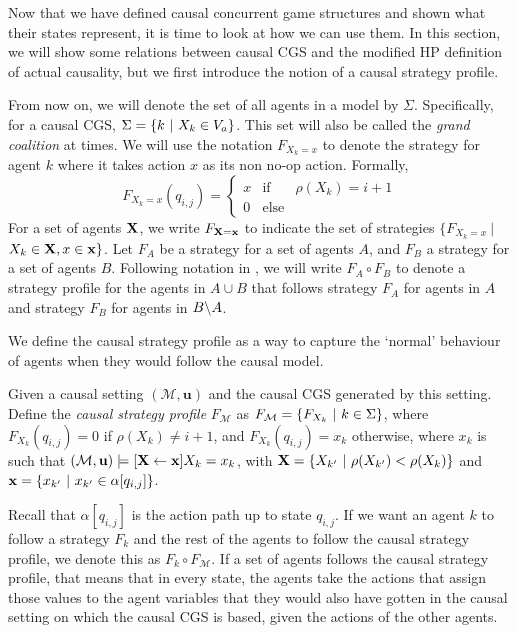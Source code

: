 Now that we have defined causal concurrent game structures and shown what their states represent, it is time to look at how we can use them.
In this section, we will show some relations between causal CGS and the modified HP definition of actual causality, but we first introduce the notion of a causal strategy profile.

From now on, we will denote the set of all agents in a model by $\Sigma$. 
Specifically, for a causal CGS, $\Sigma = \{ {k\ | \ X_k \in V_a} \}$. This set will also be called the \emph{grand coalition} at times.
We will use the notation $F_{X_k = x}$ to denote the strategy for agent $k$ where it takes action $x$ as its non no-op action.
Formally,
\[
    F_{X_k = x}(q_{i,j}) = \left\{ \begin{array}{lll}
        x & \text{if } &  \rho(X_k) = i+1 \\
         0 & \text{else}&
    \end{array}\right.
\]
For a set of agents $\mathbf{X}$, we write $F_{\mathbf{X} = \mathbf{x}}$ to indicate the set of strategies $\{F_{X_k = x} \ | \ $ $ X_k \in \mathbf{X}, x \in \mathbf{x}\}$.
Let $F_A$ be a strategy for a set of agents $A$, and $F_B$ a strategy for a set of agents $B$. 
Following notation in \cite{Brihaye_DaCosta_Laroussinie_Markey_2008}, we will write $F_A \circ F_B$ to denote a strategy profile for the agents in $A \cup B$ that follows strategy $F_A$ for agents in $A$ and strategy $F_B$ for agents in $B \backslash A$.



We define the causal strategy profile as a way to capture the `normal' behaviour of agents when they would follow the causal model.
\begin{definition}\label{def:complete causal strat profile}
Given a causal setting $(\mathcal{M},\mathbf{u})$ and the causal CGS generated by this setting.
Define the \emph{causal strategy profile} $F_\mathcal{M}$ as $F_\mathcal{M} = \{ {F_{X_k}\ |\ k \in \Sigma} \}$, where $F_{X_k}(q_{i,j}) = 0$ if $\rho(X_k) \neq i+1$, and $F_{X_k}(q_{i,j}) = x_k$ otherwise, where $x_k$ is such that $(\mathcal{M},\mathbf{u}) \models [\mathbf{X}\leftarrow\mathbf{x}] X_k = x_k$, with $\myvec{X} = \set{X_{k'} \ | \ \rho(X_{k'})<\rho(X_k)}$ and $\mathbf{x} = \{ {x_{k'} \ | \ x_{k'} \in \alpha[q_{i,j}]} \}$.
\end{definition}
Recall that $\alpha[q_{i,j}]$ is the action path up to state $q_{i,j}$.
If we want an agent $k$ to follow a strategy $F_k$ and the rest of the agents to follow the causal strategy profile, we denote this as $F_k \circ F_\mathcal{M}$.
If a set of agents follows the causal strategy profile, that means that in every state, the agents take the actions that assign those values to the agent variables that they would also have gotten in the causal setting on which the causal CGS is based, given the actions of the other agents.

